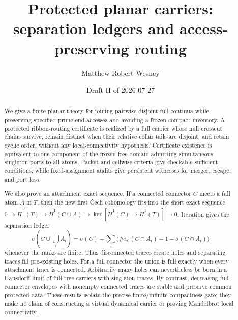 \documentclass[11pt,reqno]{amsart}
\title[Protected planar carriers]{Protected planar carriers:\\
separation ledgers and access-preserving routing}
\author{Matthew Robert Wesney}
\date{Draft II of 2026-07-27}
\theoremstyle{definition}
\theoremstyle{remark}
\begin{document}
\begin{abstract}
We give a finite planar theory for joining pairwise disjoint full continua
while preserving specified prime-end accesses and avoiding a frozen compact
inventory.  A protected ribbon-routing certificate is realized by a full
carrier whose null crosscut chains survive, remain distinct when their
relative collar tails are disjoint, and retain cyclic order, without any
local-connectivity hypothesis.  Certificate existence is equivalent to one
component of the frozen free domain admitting simultaneous singleton ports
to all atoms.  Packet and cellwise criteria give checkable sufficient
conditions, while fixed-assignment audits give persistent witnesses for
merger, escape, and port loss.

We also prove an attachment exact sequence.  If a connected connector $C$
meets a full atom $A$ in $T$, then the new first \v{C}ech cohomology fits into
the short exact sequence
$0\to\widetilde{\check H}^{\,0}(T)\to
\check H^1(C\cup A)\to
\ker[\check H^1(C)\to\check H^1(T)]\to0$.
Iteration gives the separation ledger
\[
\sigma\!\left(C\cup\bigcup_iA_i\right)
=\sigma(C)+\sum_i
\bigl(\#\pi_0(C\cap A_i)-1-\sigma(C\cap A_i)\bigr)
\]
whenever the ranks are finite.  Thus disconnected traces create holes and
separating traces fill pre-existing holes.  For a full connector the union
is full exactly when every attachment trace is connected.  Arbitrarily many
holes can nevertheless be born in a Hausdorff limit of full tree carriers
with singleton traces.  By contrast, decreasing full connector envelopes
with nonempty connected traces are stable and preserve common protected
data.
These results isolate the precise finite/infinite compactness gate; they make
no claim of constructing a virtual dynamical carrier or proving Mandelbrot
local connectivity.
\end{abstract}

\maketitle
\tableofcontents







\end{document}
